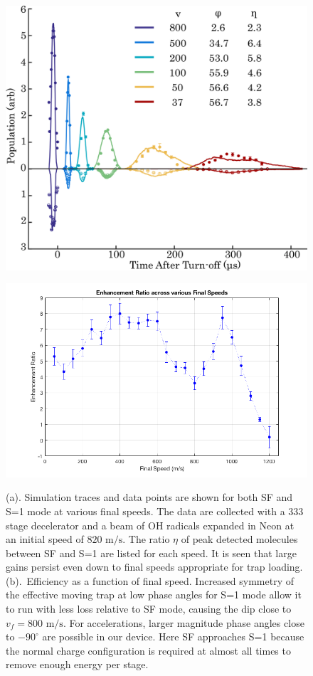 \documentclass[%
 reprint,
 amsmath,amssymb,
 aps,
prl,
]{revtex4-1}
\begin{document}
\begin{figure}[t]
\includegraphics[width=\linewidth]{speedvary.png}%

\includegraphics[width=\linewidth]{Data/ratio-combined.png}%
\label{fig:speedvary}
\caption{
(a). Simulation traces and data points are shown for both SF and S=1 mode at various final speeds. 
The data are collected with a $333$ stage decelerator and a beam of OH radicals expanded in Neon at an initial speed of $820\text{ m/s}$. 
The ratio $\eta$ of peak detected molecules between SF and S=1 are listed for each speed. 
It is seen that large gains persist even down to final speeds appropriate for trap loading.
(b).~Efficiency as a function of final speed. Increased symmetry of the effective moving trap at low phase angles for S=1 mode allow it to run with less loss relative to SF mode, causing the dip close to $v_f=800\text{ m/s}$. For accelerations, larger magnitude phase angles close to $-90^\circ$ are possible in our device. Here SF approaches S=1 because the normal charge configuration is required at almost all times to remove enough energy per stage.
}
\end{figure}
\end{document}
